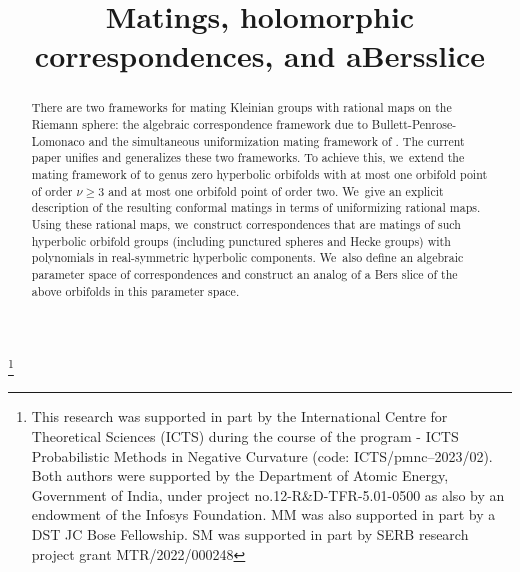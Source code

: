\documentclass[JEP,XML,SOM,Unicode,NoFloatCountersInSection,published]{cedram}
\theoremstyle{definition}
\theoremstyle{remark}
\begin{document}
\frontmatter
\title[Matings, correspondences, and a Bers slice]{Matings, holomorphic correspondences, and a\nobreakspace Bers\nobreakspace slice}

\author[\initial{M.} \lastname{Mj}]{ }
\address{School of Mathematics, Tata Institute of Fundamental Research,\\
Mumbai-400005, India}
\urladdr{}

\author[\initial{S.} \lastname{Mukherjee}]{ }
\address{School of Mathematics, Tata Institute of Fundamental Research,\\
Mumbai-400005, India}

\thanks{This research was supported in part by the International Centre for Theoretical Sciences (ICTS) during the course of the program - ICTS Probabilistic Methods in Negative Curvature (code: ICTS/pmnc--2023/02).
Both authors were supported by the Department of Atomic Energy, Government of India, under project no.12-R\&D-TFR-5.01-0500 as also by an endowment of the Infosys Foundation. MM was also supported in part by a DST JC Bose Fellowship. SM was supported in part by SERB research project grant MTR/2022/000248}

\begin{abstract}
There are two frameworks for mating Kleinian groups with rational maps on the Riemann sphere: the algebraic correspondence framework due to Bullett-Penrose-Lomonaco \cite{BP94,BL20a} and the simultaneous uniformization mating framework of \cite{MM1}. The current paper unifies and generalizes these two frameworks. To achieve this, we~extend the mating framework of \cite{MM1} to genus zero hyperbolic orbifolds with at most one orbifold point of order $\nu \geq 3$ and at most one orbifold point of order two. We~give an explicit description of the resulting conformal matings in terms of uniformizing rational maps. Using these rational maps, we~construct correspondences that are matings of such hyperbolic orbifold groups (including punctured spheres and Hecke groups) with polynomials in real-symmetric hyperbolic components. We~also define an algebraic parameter space of correspondences and construct an analog of a Bers slice of the above orbifolds in this parameter space.
\end{abstract}

\end{document}
